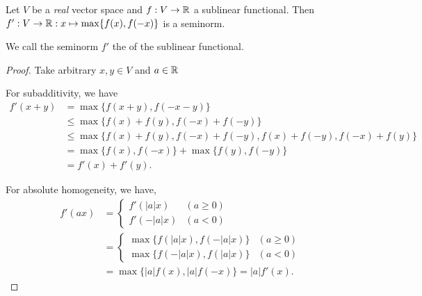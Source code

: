 \begin{lemma}
Let $V$ be a \emph{real} vector space and $f: V \to \mathbb{R}$ a sublinear functional. Then $f': V\to \mathbb{R}: x\mapsto \max\{f(x), f(-x)\}$ is a seminorm.
\end{lemma}
We call the seminorm $f'$ the  of the sublinear functional.
\begin{proof}
Take arbitrary $x,y\in V$ and $a\in \mathbb{R}$

For subadditivity, we have
\begin{align*}
f'(x+y) &= \max\{f(x+y), f(-x-y)\} \\
&\leq \max\{f(x)+f(y), f(-x)+ f(-y)\} \\
&\leq \max\{f(x)+f(y), f(-x)+ f(-y), f(x) + f(-y), f(-x) + f(y)\} \\
&= \max\{f(x), f(-x)\} + \max\{f(y), f(-y)\} \\
&= f'(x) + f'(y).
\end{align*}

For absolute homogeneity, we have,
\begin{align*}
f'(ax) &= \begin{cases}
f'(|a|x) & (a \geq 0) \\ f'(-|a|x) & (a < 0)
\end{cases} \\
&= \begin{cases}
\max\{f(|a|x), f(-|a|x)\} & (a \geq 0) \\ \max\{f(-|a|x), f(|a|x)\} & (a < 0)
\end{cases} \\
&= \max\{|a|f(x), |a|f(-x)\} = |a|f'(x).
\end{align*}
\end{proof}

